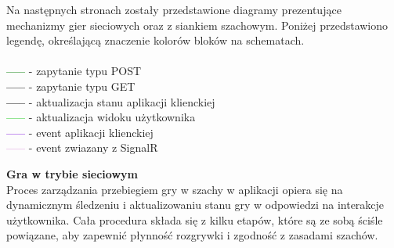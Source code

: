 \documentclass[twoside]{projektInzynierskiMS1}
\begin{document}
\noindent
Na następnych stronach zostały przedstawione diagramy prezentujące mechanizmy gier sieciowych oraz z siankiem szachowym. Poniżej przedstawiono legendę, określającą znaczenie kolorów bloków na schematach.
\\\\
\textbf{\colorbox{ForestGreen!90}{\textcolor{ForestGreen}{-----}}} - zapytanie typu POST\\
\textbf{\colorbox{Cerulean!90}{\textcolor{Cerulean}{-----}}} - zapytanie typu GET\\
\textbf{\colorbox{Dandelion!90}{\textcolor{Dandelion}{-----}}} - aktualizacja stanu aplikacji klienckiej\\
\textbf{\colorbox{LimeGreen!90}{\textcolor{LimeGreen}{-----}}} - aktualizacja widoku użytkownika\\
\textbf{\colorbox{BlueViolet!90}{\textcolor{BlueViolet}{-----}}} - event aplikacji klienckiej\\
\textbf{\colorbox{Plum!90}{\textcolor{Plum}{-----}}} - event zwiazany z SignalR\\
\vspace{0.5cm}

\noindent \textbf{Gra w trybie sieciowym}\\
Proces zarządzania przebiegiem gry w szachy w aplikacji opiera się na dynamicznym śledzeniu i aktualizowaniu stanu gry w odpowiedzi na interakcje użytkownika. Cała procedura składa się z kilku etapów, które są ze sobą ściśle powiązane, aby zapewnić płynność rozgrywki i zgodność z zasadami szachów.
\end{document}
